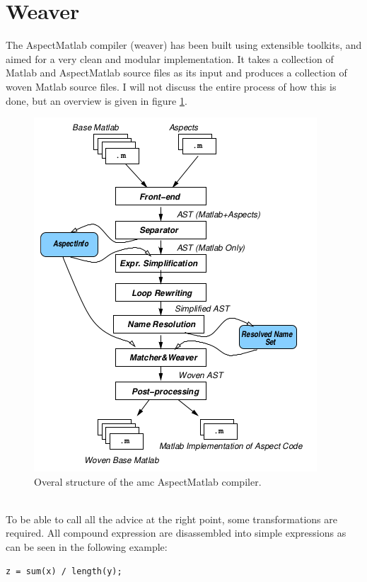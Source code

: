 \documentclass[a4paper]{report}
\begin{document}
\section{Weaver}
The AspectMatlab compiler (weaver) has been built using extensible toolkits, and aimed for a very clean and modular implementation. It takes a collection of Matlab and AspectMatlab source files as its input and produces a collection of woven Matlab source files. I will not discuss the entire process of how this is done, but an overview is given in figure \ref{fig:Matlab_Weaver}.\\
\begin{figure}[h!]
\centering
\includegraphics[scale=0.5]{images/Languages/Matlab_Weaver.png}
\caption{Overal structure of the amc AspectMatlab compiler. \citep{aslam_aspectmatlab:_2010}}
\label{fig:Matlab_Weaver}
\end{figure}
\\
To be able to call all the advice at the right point, some transformations are required. All compound expression are disassembled into simple expressions as can be seen in the following example:\\
\begin{minipage}{0.45\textwidth}
\begin{lstlisting}[caption=Original code.]
z = sum(x) / length(y);
\end{lstlisting}
\end{minipage}\hfill
\end{document}
